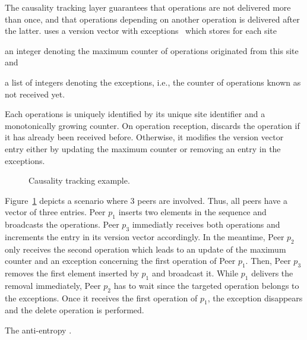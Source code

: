\begin{asparadesc}
\item [The causality tracking layer] guarantees that operations are not
  delivered more than once, and that operations depending on another operation
  is delivered after the latter. \CRATE uses a version vector with
  exceptions~\cite{malkhi2007concise} which stores for each
  site
  \begin{inparaenum}[(i)]
  \item an integer denoting the maximum counter of operations originated from
    this site and
  \item a list of integers denoting the exceptions, i.e., the counter of
    operations known as not received yet.
  \end{inparaenum}

  Each operations is uniquely identified by its unique site identifier and a
  monotonically growing counter. On operation reception, \CRATE discards the
  operation if it has already been received before. Otherwise, it modifies the
  version vector entry either by updating the maximum counter or removing an
  entry in the exceptions.

  \begin{figure}
    
    \caption{\label{fig:timeline}Causality tracking example.}
  \end{figure}

  Figure~\ref{fig:timeline} depicts a scenario where 3 peers are involved. Thus,
  all peers have a vector of three entries. Peer $p_1$ inserts two elements in
  the sequence and broadcasts the operations. Peer $p_3$ immediatly receives
  both operations and increments the entry in its version vector accordingly.
  In the meantime, Peer $p_2$ only receives the second operation which leads to
  an update of the maximum counter and an exception concerning the first
  operation of Peer $p_1$. Then, Peer $p_3$ removes the first element inserted
  by $p_1$ and broadcast it. While $p_1$ delivers the removal immediately, Peer
  $p_2$ has to wait since the targeted operation belongs to the exceptions. Once
  it receives the first operation of $p_1$, the exception disappears and the
  delete operation is performed.

  The anti-entropy .

\end{asparadesc}

